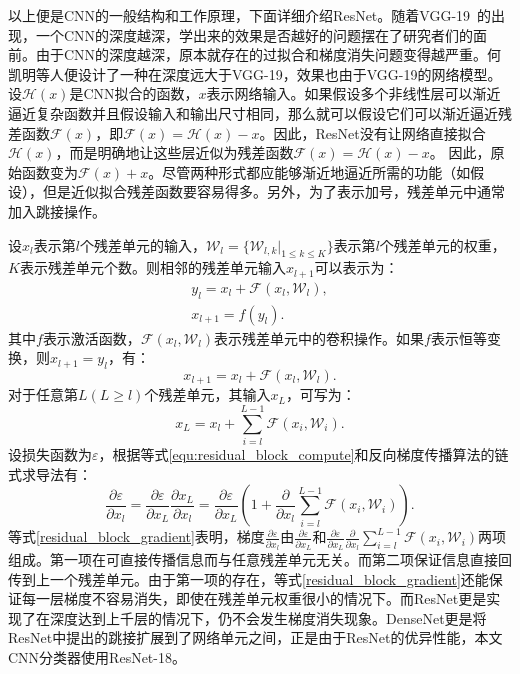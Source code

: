 以上便是CNN的一般结构和工作原理，下面详细介绍ResNet。随着VGG-19~\cite{simonyan2014very}的出现，一个CNN的深度越深，学出来的效果是否越好的问题摆在了研究者们的面前。由于CNN的深度越深，原本就存在的过拟合和梯度消失问题变得越严重。何凯明等人便设计了一种在深度远大于VGG-19，效果也由于VGG-19的网络模型。设$\mathcal{H}(x)$是CNN拟合的函数，$x$表示网络输入。如果假设多个非线性层可以渐近逼近复杂函数并且假设输入和输出尺寸相同，那么就可以假设它们可以渐近逼近残差函数$\mathcal{F}(x)$，即$\mathcal{F}(x)=\mathcal{H}(x)− x$。因此，ResNet没有让网络直接拟合$\mathcal{H}(x)$，而是明确地让这些层近似为残差函数$\mathcal{F}(x)=\mathcal{H}(x)-x$。 因此，原始函数变为$\mathcal{F}(x)+x$。尽管两种形式都应能够渐近地逼近所需的功能（如假设），但是近似拟合残差函数要容易得多。另外，为了表示加号，残差单元中通常加入跳接操作。

设$x_l$表示第$l$个残差单元的输入，$\mathcal{W}_{l}=\{\mathcal{W}_{l,k}|_{1\leq k \leq K}\}$表示第$l$个残差单元的权重，$K$表示残差单元个数。则相邻的残差单元输入$x_{l+1}$可以表示为：
\begin{gather*}
	y_{l}=x_l + \mathcal{F}(x_l, \mathcal{W}_l), \\
	x_{l+1}=f(y_{l}).
\end{gather*}
其中$f$表示激活函数，$\mathcal{F}(x_l, \mathcal{W}_l)$表示残差单元中的卷积操作。如果$f$表示恒等变换，则$x_{l+1}=y_{l}$，有：
\begin{equation*}
	x_{l+1}=x_l + \mathcal{F}(x_l, \mathcal{W}_l).
\end{equation*}
对于任意第$L(L\ge l)$个残差单元，其输入$x_{L}$，可写为：
\begin{equation}\label{equ:residual_block_compute}
x_{L}=x_l + \sum_{i=l}^{L-1}\mathcal{F}(x_i, \mathcal{W}_i).
\end{equation}
设损失函数为$\varepsilon$，根据等式\ref{equ:residual_block_compute}和反向梯度传播算法的链式求导法有：
\begin{equation}\label{residual_block_gradient}
\frac{\partial \varepsilon}{\partial x_l}=\frac{\partial \varepsilon}{\partial x_L}\frac{\partial x_L}{\partial x_l}=\frac{\partial \varepsilon}{\partial x_L}(1+\frac{\partial}{\partial x_l}\sum_{i=l}^{L-1}\mathcal{F}(x_i,\mathcal{W}_i)).
\end{equation}
等式\ref{residual_block_gradient}表明，梯度$\frac{\partial \varepsilon}{\partial x_l}$由$\frac{\partial \varepsilon}{\partial x_L}$和$\frac{\partial \varepsilon}{\partial x_L}\frac{\partial}{\partial x_l}\sum_{i=l}^{L-1}\mathcal{F}(x_i,\mathcal{W}_i)$两项组成。第一项在可直接传播信息而与任意残差单元无关。而第二项保证信息直接回传到上一个残差单元。由于第一项的存在，等式\ref{residual_block_gradient}还能保证每一层梯度不容易消失，即使在残差单元权重很小的情况下。而ResNet更是实现了在深度达到上千层的情况下，仍不会发生梯度消失现象。DenseNet更是将ResNet中提出的跳接扩展到了网络单元之间，正是由于ResNet的优异性能，本文CNN分类器使用ResNet-18。
